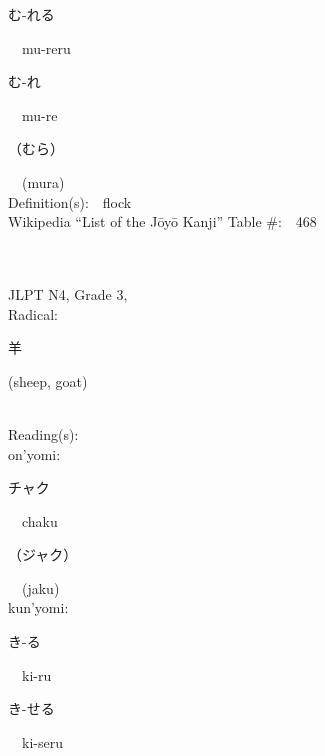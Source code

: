 \begin{multicols}{2}
{\hspace*{2em}}{\begin{CJK}{UTF8}{min} む-れる \end{CJK}}\ \ mu-reru\ \ \\
{\hspace*{2em}}{\begin{CJK}{UTF8}{min} む-れ \end{CJK}}\ \ mu-re\ \ \\
{\hspace*{2em}}{\begin{CJK}{UTF8}{min} （むら） \end{CJK}}\ \ (mura)\ \ \\
Definition(s):\ \ flock \\
Wikipedia ``List of the J\=oy\=o Kanji'' Table \#:\ \ 468 \\
\ \ \\
{\fontsize{34pt}{40pt}  }\ \ \\  %
{JLPT N4, Grade 3, \\Radical:\ \ {\begin{CJK}{UTF8}{min} 羊 \end{CJK}} (sheep, goat) } \\
Reading(s):\ \ \\
{\hspace*{1em}}on'yomi:\ \ \\
{\hspace*{2em}}{\begin{CJK}{UTF8}{min} チャク \end{CJK}}\ \ chaku\ \ \\
{\hspace*{2em}}{\begin{CJK}{UTF8}{min} （ジャク） \end{CJK}}\ \ (jaku)\ \ \\
{\hspace*{1em}}kun'yomi:\ \ \\
{\hspace*{2em}}{\begin{CJK}{UTF8}{min} き-る \end{CJK}}\ \ ki-ru\ \ \\
{\hspace*{2em}}{\begin{CJK}{UTF8}{min} き-せる \end{CJK}}\ \ ki-seru\ \ \\

\end{multicols}
